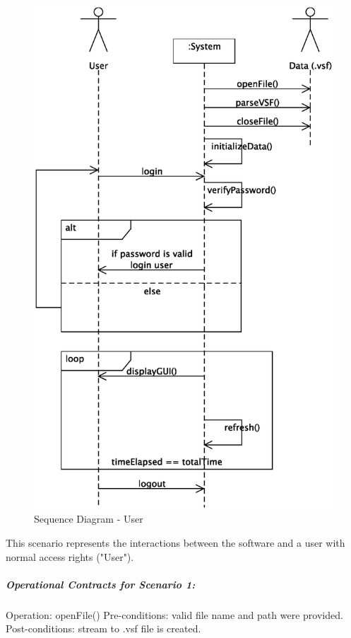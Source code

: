 \documentclass{article}
\begin{document}
\begin{figure}[!htb]
\caption{Sequence Diagram - User}
\centering
\includegraphics[scale=0.6]{diagrams/user-sequence-diagram.eps}
\end{figure}

This scenario represents the interactions between the software and a user with normal access rights ("User").

\subparagraph{Operational Contracts for Scenario 1:}

Operation: openFile()
Pre-conditions: valid file name and path were provided.
Post-conditions: stream to .vsf file is created.
\end{document}
